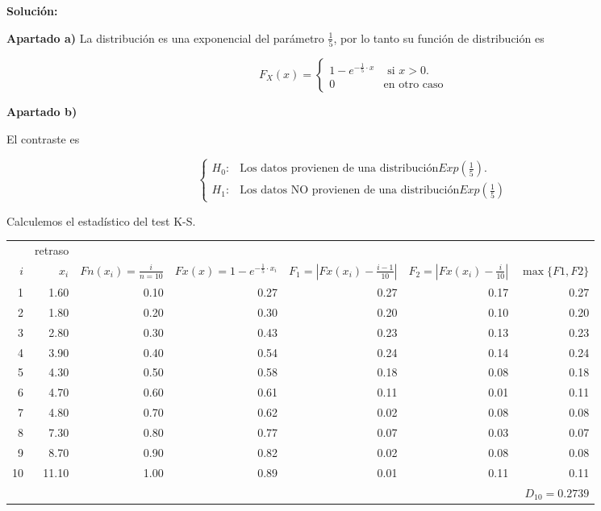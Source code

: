 \documentclass[10pt]{article}
\newif\ifsol
\begin{document}
\ifsol
{\sf
\textbf{Solución:}


\textbf{Apartado a)} La distribución es una  exponencial del parámetro $\frac{1}{5}$, por lo tanto su función de distribución es 


$$F_X(x)=\left\{
\begin{array}{ll}
1-e^{-\frac{1}{5}\cdot x}  & \mbox{ si } x>0. \\
0 &  \mbox{en otro caso}
\end{array}\right.$$

\textbf{Apartado b)}

El contraste es 

$$\left\{
\begin{array}{ll}
H_0: & \mbox{Los datos provienen de una distribución} Exp(\frac{1}{5}). \\
H_1: &  \mbox{Los datos NO provienen de una distribución} Exp(\frac{1}{5})
\end{array}\right.$$

Calculemos el estadístico del test  K-S.


\begin{table}[ht]
\centering
\scriptsize
\begin{tabular}{|r|r|r|r|r|r|r|}
  \hline
   &  retraso  &  &  & & &  \\
  $i$ & $x_i$ & $Fn(x_i)=\frac{i}{n=10}$ & $Fx(x)=1-e^{-\frac{1}{5}\cdot x_i}$ & $F_1=|Fx(x_i)-\frac{i-1}{10}|$ & $F_2=|Fx(x_i)-\frac{i}{10}|$ &  $\max\{F1,F2\}$ \\ 
  \hline
   1 & 1.60 & 0.10 & 0.27 & 0.27 & 0.17 & 0.27 \\ 
   2 & 1.80 & 0.20 & 0.30 & 0.20 & 0.10 & 0.20 \\ 
   3 & 2.80 & 0.30 & 0.43 & 0.23 & 0.13 & 0.23 \\ 
   4 & 3.90 & 0.40 & 0.54 & 0.24 & 0.14 & 0.24 \\ 
   5 & 4.30 & 0.50 & 0.58 & 0.18 & 0.08 & 0.18 \\ 
   6 & 4.70 & 0.60 & 0.61 & 0.11 & 0.01 & 0.11 \\ 
   7 & 4.80 & 0.70 & 0.62 & 0.02 & 0.08 & 0.08 \\ 
   8 & 7.30 & 0.80 & 0.77 & 0.07 & 0.03 & 0.07 \\ 
   9 & 8.70 & 0.90 & 0.82 & 0.02 & 0.08 & 0.08 \\ 
  10 & 11.10 & 1.00 & 0.89 & 0.01 & 0.11 & 0.11 \\ 
   \hline
\multicolumn{6}{c|}{} & $D_{10}=0.2739$\\
\cline{7-7}
\end{tabular}
\end{table}


}
\end{document}

